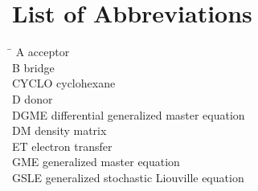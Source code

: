 \documentclass[12pt,twoside,a4paper]{report}
\begin{document}
\chapter*{List of Abbreviations}
\begin{tabbing}
\hspace*{4cm}\= \kill
%
A                      \> acceptor\\
B                      \> bridge\\
CYCLO                  \> cyclohexane\\
D                      \> donor\\
DGME                   \> differential generalized master equation\\
DM                     \> density matrix\\
ET                    \> electron transfer\\
GME                   \> generalized master equation\\
GSLE                  \> generalized stochastic Liouville equation\\

\end{tabbing}
\end{document}
